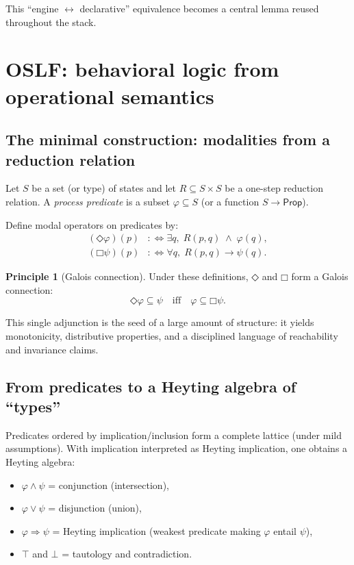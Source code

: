\documentclass[11pt]{article}
\newcommand{\DiamondOp}{\mathbin{\Diamond}}
\newcommand{\BoxOp}{\mathbin{\Box}}
\newcommand{\meet}{\wedge}
\newcommand{\join}{\vee}
\newcommand{\botEl}{\bot}
\newcommand{\topEl}{\top}
\theoremstyle{definition}
\newtheorem{principle}{Principle}
\begin{document}
This ``engine $\leftrightarrow$ declarative'' equivalence becomes a central lemma reused throughout the stack.

\section{OSLF: behavioral logic from operational semantics}

\subsection{The minimal construction: modalities from a reduction relation}

Let $S$ be a set (or type) of states and let $R \subseteq S \times S$ be a one-step reduction relation.
A \emph{process predicate} is a subset $\varphi \subseteq S$ (or a function $S \to \mathsf{Prop}$).

Define modal operators on predicates by:
\begin{align*}
(\DiamondOp \varphi)(p) &:\iff \exists q,\; R(p,q) \;\wedge\; \varphi(q),\\
(\BoxOp \psi)(p) &:\iff \forall q,\; R(p,q) \to \psi(q).
\end{align*}

\begin{principle}[Galois connection]
Under these definitions, $\DiamondOp$ and $\BoxOp$ form a Galois connection:
\[
\DiamondOp \varphi \subseteq \psi \quad\text{iff}\quad \varphi \subseteq \BoxOp \psi.
\]
\end{principle}

This single adjunction is the seed of a large amount of structure:
it yields monotonicity, distributive properties, and a disciplined language of reachability
and invariance claims.

\subsection{From predicates to a Heyting algebra of ``types''}

Predicates ordered by implication/inclusion form a complete lattice (under mild assumptions).
With implication interpreted as Heyting implication, one obtains a Heyting algebra:
\begin{itemize}[leftmargin=1.5em]
\item $\varphi \meet \psi$ = conjunction (intersection),
\item $\varphi \join \psi$ = disjunction (union),
\item $\varphi \Rightarrow \psi$ = Heyting implication (weakest predicate making $\varphi$ entail $\psi$),
\item $\topEl$ and $\botEl$ = tautology and contradiction.
\end{itemize}
\end{document}
